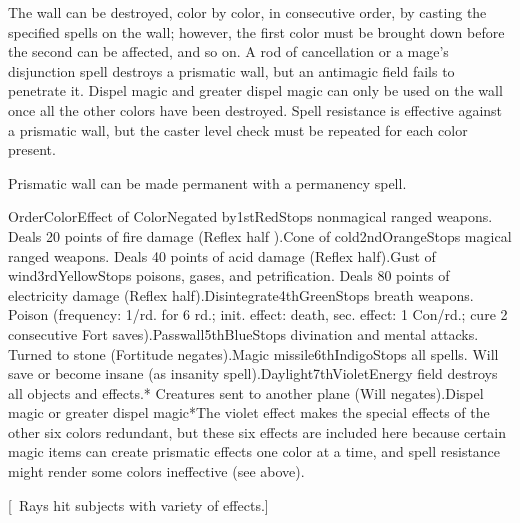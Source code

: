 {The wall can be destroyed, color by color, in consecutive order, by casting the specified spells on the wall; however, the first color must be brought down before the second can be affected, and so on. A rod of cancellation or a mage's disjunction spell destroys a prismatic wall, but an antimagic field fails to penetrate it. Dispel magic and greater dispel magic can only be used on the wall once all the other colors have been destroyed. Spell resistance is effective against a prismatic wall, but the caster level check must be repeated for each color present.

Prismatic wall can be made permanent with a permanency spell.

 OrderColorEffect of ColorNegated by1stRedStops nonmagical ranged weapons. Deals 20 points of fire damage (Reflex half ).Cone of cold2ndOrangeStops magical ranged weapons. Deals 40 points of acid damage (Reflex half).Gust of wind3rdYellowStops poisons, gases, and petrification. Deals 80 points of electricity damage (Reflex half).Disintegrate4thGreenStops breath weapons. Poison (frequency: 1/rd. for 6 rd.; init. effect: death, sec. effect: 1 Con/rd.; cure 2 consecutive Fort saves).Passwall5thBlueStops divination and mental attacks. Turned to stone (Fortitude negates).Magic missile6thIndigoStops all spells. Will save or become insane (as insanity spell).Daylight7thVioletEnergy field destroys all objects and effects.* Creatures sent to another plane (Will negates).Dispel magic or greater dispel magic*The violet effect makes the special effects of the other six colors redundant, but these six effects are included here because certain magic items can create prismatic effects one color at a time, and spell resistance might render some colors ineffective (see above). }
        
[ Rays hit subjects with variety of effects.]
        
